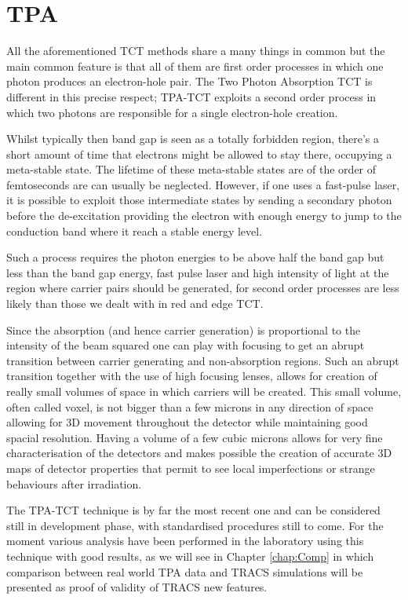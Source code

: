 \section{TPA} %
\label{sec:results_and_comparison_with_tracs_rad}

All the aforementioned TCT methods share a many things in common but the main common feature is that all of them are first order processes in which one photon produces an electron-hole pair. The Two Photon Absorption TCT is different in this precise respect; TPA-TCT exploits a second order process in which two photons are responsible for a single electron-hole creation.

Whilst typically then band gap is seen as a totally forbidden region, there's a short amount of time that electrons might be allowed to stay there, occupying a meta-stable state. The lifetime of these meta-stable states are of the order of femtoseconds are can usually be neglected. However, if one uses a fast-pulse laser, it is possible to exploit those intermediate states by sending a secondary photon before the de-excitation providing the electron with enough energy to jump to the conduction band where it reach a stable energy level.

Such a process requires the photon energies to be above half the band gap but less than the band gap energy, fast pulse laser and high intensity of light at the region where carrier pairs should be generated, for second order processes are less likely than those we dealt with in red and edge TCT.

Since the absorption (and hence carrier generation) is proportional to the intensity of the beam squared one can play with focusing to get an abrupt transition between carrier generating and non-absorption regions. Such an abrupt transition together with the use of high focusing lenses, allows for creation of really small volumes of space in which carriers will be created. 
 This small volume, often called voxel, is not bigger than a few microns in any direction of space allowing for 3D movement throughout the detector while maintaining good spacial resolution. Having a volume of a few cubic microns allows for very fine characterisation of the detectors and makes possible the creation of accurate 3D maps of detector properties that permit to see local imperfections or strange behaviours after irradiation.

 The TPA-TCT technique is by far the most recent one and can be considered still in development phase, with standardised procedures still to come. For the moment various analysis have been performed in the laboratory using this technique with good results, as we will see in Chapter \ref{chap:Comp} in which comparison between real world TPA data and TRACS simulations will be presented as proof of validity of TRACS new features.


